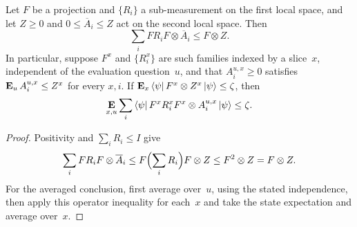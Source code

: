 \documentclass[11pt]{article}
\theoremstyle{definition}
\newcommand{\E}{\mathop{\bf E\/}}
\begin{document}
\begin{lemma}\label{lem:boundedness-rejection}
Let $F$ be a projection and $\{R_i\}$ a sub-measurement on the
first local space, and let $Z\geq0$ and $0\leq\overline A_i\leq Z$
act on the second local space.  Then
\begin{equation}\label{eq:boundedness-rejection-operator}
 \sum_iFR_iF\otimes\overline A_i\leq F\otimes Z.
\end{equation}
In particular, suppose $F^x$ and $\{R_i^x\}$ are such families
indexed by a slice~$x$, independent of the evaluation question~$u$,
and that $A_i^{u,x}\geq0$ satisfies
$\E_uA_i^{u,x}\leq Z^x$ for every $x,i$.  If
$\E_x\bra\psi F^x\otimes Z^x\ket\psi\leq\zeta$, then
\begin{equation}\label{eq:boundedness-rejection-average}
 \E_{x,u}\sum_i
 \bra\psi F^xR_i^xF^x\otimes A_i^{u,x}\ket\psi\leq\zeta.
\end{equation}
\end{lemma}
\begin{proof}
Positivity and $\sum_iR_i\leq I$ give
\[
 \sum_iFR_iF\otimes\overline A_i
 \leq F\Bigl(\sum_iR_i\Bigr)F\otimes Z
 \leq F^2\otimes Z=F\otimes Z.
\]
For the averaged conclusion, first average over~$u$, using the
stated independence, then apply this operator inequality for each~$x$
and take the state expectation and average over~$x$.
\end{proof}
\end{document}
